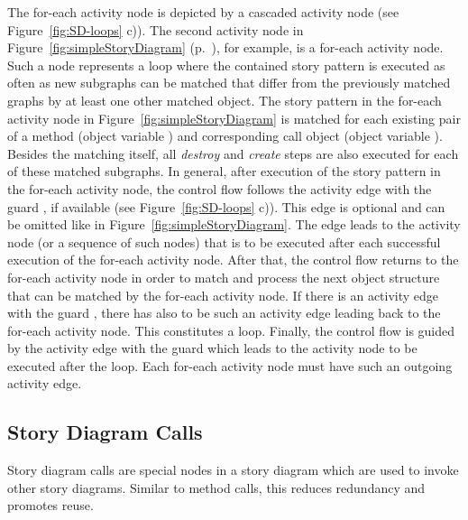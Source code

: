 The for-each activity node is depicted by a cascaded activity node (see Figure~\ref{fig:SD-loops} c)).
The second activity node in Figure~\ref{fig:simpleStoryDiagram} (p.~\pageref{fig:simpleStoryDiagram}), for example, is a for-each activity node.
Such a node represents a loop where the contained story pattern is executed as often as new subgraphs can be matched
that differ from the previously matched graphs by at least one other matched object.
The story pattern in the for-each activity node in Figure~\ref{fig:simpleStoryDiagram}
is matched for each existing pair of a method (object variable ) and corresponding call object (object variable ).
Besides the matching itself, all \emph{destroy} and \emph{create} steps are also executed for each of these matched subgraphs.
In general, after execution of the story pattern in the for-each activity node,
the control flow follows the activity edge with the guard , if available (see Figure~\ref{fig:SD-loops} c)).
This edge is optional and can be omitted like in Figure~\ref{fig:simpleStoryDiagram}.
The  edge leads to the activity node (or a sequence of such nodes)
that is to be executed after each successful execution of the for-each activity node.
After that, the control flow returns to the for-each activity node in order to match and process the next object structure that can be matched by the for-each activity node.
If there is an activity edge with the guard , there has also to be such an activity edge leading back to the for-each activity node.
This constitutes a loop.
Finally, the control flow is guided by the activity edge with the guard  which leads to the activity node to be executed after the loop.
Each for-each activity node must have such an outgoing  activity edge.



\subsection{Story Diagram Calls}
\label{sec:Calls}
Story diagram calls are special nodes in a story diagram which are used to invoke other story diagrams. Similar to method calls, this reduces redundancy and promotes reuse.

